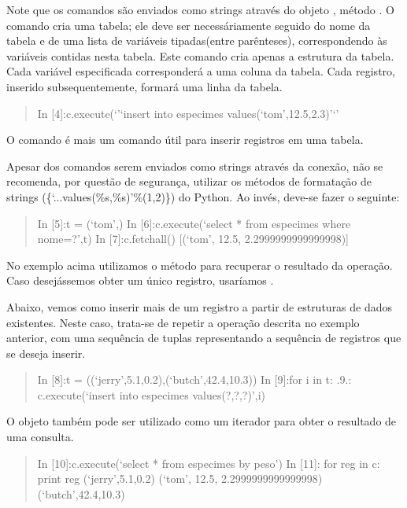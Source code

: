 \documentclass[a4paper,10pt,brazil]{sphinxmanual}
\begin{document}
Note que os comandos  são enviados como strings através do
objeto , método . O comando
 cria uma tabela; ele deve ser necessáriamente
seguido do nome da tabela e de uma lista de variáveis tipadas(entre
parênteses), correspondendo às variáveis contidas nesta tabela.
Este comando cria apenas a estrutura da tabela. Cada variável
especificada corresponderá a uma coluna da tabela. Cada registro,
inserido subsequentemente, formará uma linha da tabela.
\begin{quote}

In {[}4{]}:c.execute(`'`insert into especimes
values(`tom',12.5,2.3)'`'
\end{quote}

O comando  é mais um comando  útil para inserir
registros em uma tabela.

Apesar dos comandos  serem enviados como strings através da
conexão, não se recomenda, por questão de segurança, utilizar os
métodos de formatação de strings (\{`...values(\%s,\%s)'\%(1,2)\}) do
Python. Ao invés, deve-se fazer o seguinte:
\begin{quote}

In {[}5{]}:t = (`tom',) In {[}6{]}:c.execute(`select * from especimes
where nome=?',t) In {[}7{]}:c.fetchall() {[}(`tom', 12.5,
2.2999999999999998){]}
\end{quote}

No exemplo acima utilizamos o método  para recuperar o
resultado da operação. Caso desejássemos obter um único registro,
usaríamos .

Abaixo, vemos como inserir mais de um registro a partir de
estruturas de dados existentes. Neste caso, trata-se de repetir a
operação descrita no exemplo anterior, com uma sequência de tuplas
representando a sequência de registros que se deseja inserir.
\begin{quote}

In {[}8{]}:t = ((`jerry',5.1,0.2),(`butch',42.4,10.3)) In {[}9{]}:for i in
t: .9.: c.execute(`insert into especimes values(?,?,?)',i)
\end{quote}

O objeto  também pode ser utilizado como um iterador para
obter o resultado de uma consulta.
\begin{quote}

In {[}10{]}:c.execute(`select * from especimes by peso') In {[}11{]}: for
reg in c: print reg (`jerry',5.1,0.2) (`tom', 12.5,
2.2999999999999998) (`butch',42.4,10.3)
\end{quote}
\end{document}
